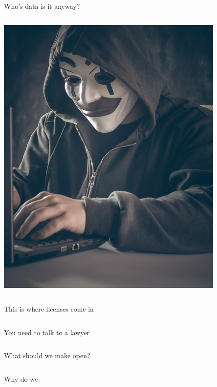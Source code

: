 \begin{frame}{Who's data is it anyway?}
\begin{columns}[c]
    \begin{column}{0.45\textwidth}
        \includegraphics[width=0.85\textwidth]{images/bermix-studio-F7DAQIDSk98-unsplash.jpg}
    \end{column}

\end{columns}

\end{frame}

\begin{frame}{This is where licenses come in}

\begin{columns}[c]

You need to talk to a lawyer

\end{columns}

\end{frame}

\begin{frame}{What should we make open?}

\begin{columns}[c]
    \begin{column}{0.45\textwidth}

    Why do we 

    \end{column}
\end{columns}

\end{frame}
